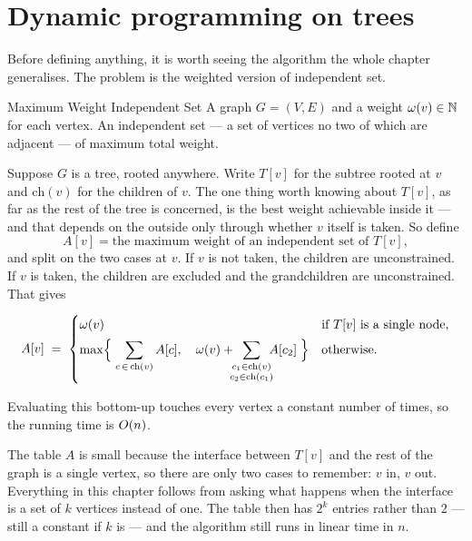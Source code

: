 \section{Dynamic programming on trees}
\label{sec:dp-on-trees}

Before defining anything, it is worth seeing the algorithm the whole chapter
generalises. The problem is the weighted version of independent set.

\begin{probdef}{Maximum Weight Independent Set}
  \instance A graph $G = (V,E)$ and a weight $\omega(v) \in \mathbb{N}$ for each vertex.
  \question An independent set --- a set of vertices no two of which are
  adjacent --- of maximum total weight.
\end{probdef}

Suppose $G$ is a tree, rooted anywhere. Write $T[v]$ for the subtree rooted at
$v$ and $\mathrm{ch}(v)$ for the children of $v$. The one thing worth knowing
about $T[v]$, as far as the rest of the tree is concerned, is the best weight
achievable inside it --- and that depends on the outside only through whether
$v$ itself is taken. So define
\[ A[v] = \text{the maximum weight of an independent set of } T[v], \]
and split on the two cases at $v$. If $v$ is not taken, the children are
unconstrained. If $v$ is taken, the children are excluded and the
grandchildren are unconstrained. That gives

\begin{equation}\label{eq:tw-tree-dp}
  A[v] \;=\;
  \begin{cases}
    \omega(v) & \text{if } T[v] \text{ is a single node,} \\[4pt]
    \max\Bigl\{\;
      \displaystyle\sum_{c \,\in\, \mathrm{ch}(v)} A[c],
      \quad
      \omega(v) + \!\!\!\displaystyle\sum_{\substack{c_1 \in \mathrm{ch}(v) \\
                                          c_2 \in \mathrm{ch}(c_1)}}\!\!\! A[c_2]
    \;\Bigr\} & \text{otherwise.}
  \end{cases}
\end{equation}

Evaluating this bottom-up touches every vertex a constant number of times, so
the running time is $O\!\left(n\right)$.

\begin{intuition}
The table $A$ is small because the interface between $T[v]$ and the rest of the
graph is a single vertex, so there are only two cases to remember: $v$ in, $v$
out. Everything in this chapter follows from asking what happens when the
interface is a set of $k$ vertices instead of one. The table then has $2^k$
entries rather than $2$ --- still a constant if $k$ is --- and the algorithm
still runs in linear time in $n$.
\end{intuition}

